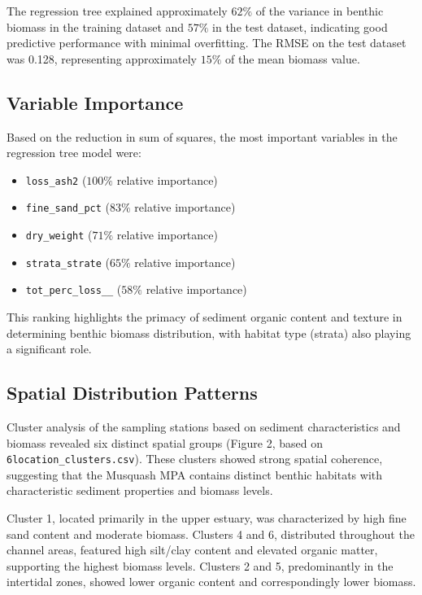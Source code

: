 \documentclass[12pt]{article}
\begin{document}
\qquad The regression tree explained approximately $62\%$ of the variance in benthic biomass in the training dataset and $57\%$ in the test dataset, indicating good predictive performance with minimal overfitting. The RMSE on the test dataset was 0.128, representing approximately $15\%$ of the mean biomass value.

\subsection{Variable Importance}

\qquad Based on the reduction in sum of squares, the most important variables in the regression tree model were:

\begin{itemize}
    \item \texttt{loss\_ash2} ($100\%$ relative importance)
    \item \texttt{fine\_sand\_pct} ($83\%$ relative importance)
    \item \texttt{dry\_weight} ($71\%$ relative importance)
    \item \texttt{strata\_strate} ($65\%$ relative importance)
    \item \texttt{tot\_perc\_loss\_\_} ($58\%$ relative importance)
\end{itemize}

\qquad This ranking highlights the primacy of sediment organic content and texture in determining benthic biomass distribution, with habitat type (strata) also playing a significant role.

\subsection{Spatial Distribution Patterns}

\qquad Cluster analysis of the sampling stations based on sediment characteristics and biomass revealed six distinct spatial groups (Figure 2, based on \texttt{6location\_clusters.csv}). These clusters showed strong spatial coherence, suggesting that the Musquash MPA contains distinct benthic habitats with characteristic sediment properties and biomass levels.


\qquad Cluster 1, located primarily in the upper estuary, was characterized by high fine sand content and moderate biomass. Clusters 4 and 6, distributed throughout the channel areas, featured high silt/clay content and elevated organic matter, supporting the highest biomass levels. Clusters 2 and 5, predominantly in the intertidal zones, showed lower organic content and correspondingly lower biomass.
\end{document}
